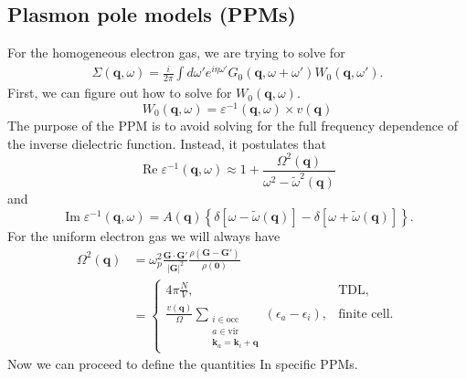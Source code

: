 \subsection{Plasmon pole models (PPMs)}
For the homogeneous electron gas, we are trying to solve for
\begin{align}
    \Sigma(\boldsymbol{q}, \omega) = \frac{i}{2\pi} \int d\omega' e^{i\eta \omega'} G_0(\boldsymbol{q}, \omega + \omega') W_0(\boldsymbol{q}, \omega').
\end{align}
First, we can figure out how to solve for $W_0(\boldsymbol{q}, \omega)$.
\begin{equation}
    W_0(\mathbf{q}, \omega) =  \varepsilon^{-1}(\mathbf{q}, \omega) \times v(\mathbf{q})
\end{equation}
The purpose of the PPM is to avoid solving for the full frequency dependence of the inverse dielectric function. Instead, it postulates that
\begin{equation}
\operatorname{Re} \varepsilon^{-1}(\mathbf{q}, \omega) \approx 1+\frac{\Omega^2(\mathbf{q})}{\omega^2-\tilde{\omega}^2(\mathbf{q})}
\end{equation}
and
\begin{equation}
    \operatorname{Im} \varepsilon^{-1}(\mathbf{q},\omega ) =A(\mathbf{q})\left\{\delta\left[\omega-\widetilde{\omega}(\mathbf{q})\right]-\delta\left[\omega+\widetilde{\omega}(\mathbf{q})\right]\right\}.
\end{equation}
For the uniform electron gas we will always have 
\begin{align}
\Omega^2(\mathbf q)
&=
\omega_p^2
\frac{\mathbf G\cdot \mathbf G'}{|\mathbf G|^2}
\frac{\rho(\mathbf G-\mathbf G')}{\rho(\mathbf 0)}
\\[0.5em]
&=
\begin{cases}
\displaystyle
4\pi \frac{N}{V},
& \text{TDL}, \\[1em]
\displaystyle
\frac{v(\mathbf q)}{\Omega}
\sum_{\substack{
i\in\mathrm{occ}\\
a\in\mathrm{vir}\\
\mathbf k_a=\mathbf k_i+\mathbf q
}}
\left(\epsilon_a-\epsilon_i\right),
& \text{finite cell}.
\end{cases}
\end{align}
Now we can proceed to define the quantities In specific  PPMs. 
